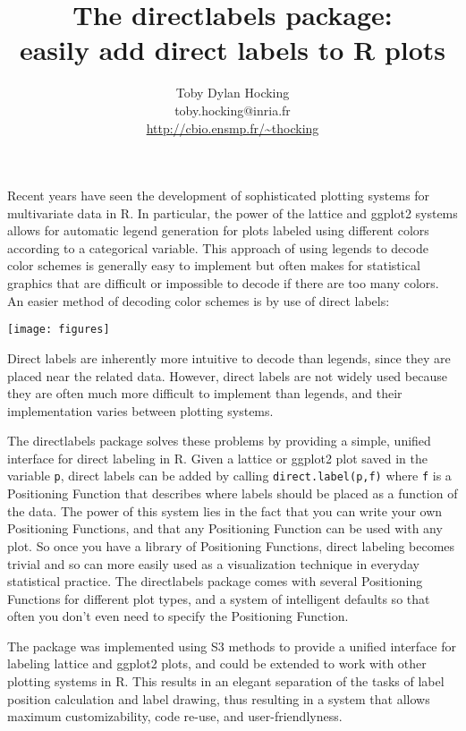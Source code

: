 \documentclass[12pt]{article}
\title{The directlabels package:\\ easily add direct
  labels to R plots}
\author{Toby Dylan Hocking\\
  toby.hocking@inria.fr\\
  \url{http://cbio.ensmp.fr/~thocking}
}
\begin{document}
\maketitle

Recent years have seen the development of sophisticated plotting
systems for multivariate data in R. In particular, the power of the
lattice and ggplot2 systems allows for automatic legend generation for
plots labeled using different colors according to a categorical
variable. This approach of using legends to decode color schemes is
generally easy to implement but often makes for statistical graphics
that are difficult or impossible to decode if there are too many
colors. An easier method of decoding color schemes is by use of direct
labels:

\begin{center}
\texttt{[image: figures]}
\end{center}

Direct labels are inherently more intuitive to decode than legends,
since they are placed near the related data. However, direct labels
are not widely used because they are often much more difficult to
implement than legends, and their implementation varies between
plotting systems.

The directlabels package solves these problems by providing a simple,
unified interface for direct labeling in R. Given a lattice or ggplot2
plot saved in the variable \texttt{p}, direct labels can be added by
calling \texttt{direct.label(p,f)} where \texttt{f} is a Positioning
Function that describes where labels should be placed as a function of
the data. The power of this system lies in the fact that you can write
your own Positioning Functions, and that any Positioning Function can
be used with any plot. So once you have a library of Positioning
Functions, direct labeling becomes trivial and so can more easily used
as a visualization technique in everyday statistical practice. The
directlabels package comes with several Positioning Functions for
different plot types, and a system of intelligent defaults so that
often you don't even need to specify the Positioning Function.

The package was implemented using S3 methods to provide a unified
interface for labeling lattice and ggplot2 plots, and could be
extended to work with other plotting systems in R. This results in an
elegant separation of the tasks of label position calculation and
label drawing, thus resulting in a system that allows maximum
customizability, code re-use, and user-friendlyness.
\end{document}
